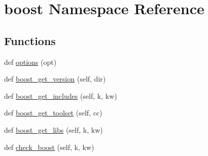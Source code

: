 \hypertarget{namespaceboost}{}\section{boost Namespace Reference}
\label{namespaceboost}
\subsection*{Functions}
\begin{DoxyCompactItemize}
\item 
def \hyperlink{namespaceboost_a324bdb031beb2c7ee3822b865d273189}{options} (opt)
\item 
def \hyperlink{namespaceboost_a2c8a0da3e4529a028023faa9c9242971}{boost\+\_\+get\+\_\+version} (self, dir)
\item 
def \hyperlink{namespaceboost_a1532e03be757c8f136d32666c0b1812f}{boost\+\_\+get\+\_\+includes} (self, k, kw)
\item 
def \hyperlink{namespaceboost_ad73a5218b2fe1e22bbf21ee84f7140fd}{boost\+\_\+get\+\_\+toolset} (self, cc)
\item 
def \hyperlink{namespaceboost_a63795151ba93016731d40cf501d54600}{boost\+\_\+get\+\_\+libs} (self, k, kw)
\item 
def \hyperlink{namespaceboost_a3005f490acc099d2380963076a53fcab}{check\+\_\+boost} (self, k, kw)
\end{DoxyCompactItemize}
